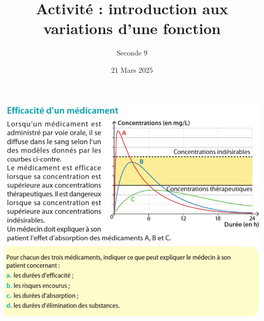 \documentclass{article}
\title{Activité : introduction aux variations d'une fonction}
\author{Seconde 9}
\date{21 Mars 2025}
\begin{document}
\maketitle

\begin{center}
\includegraphics[width=\textwidth]{Activite.png}
\end{center}
\end{document}
